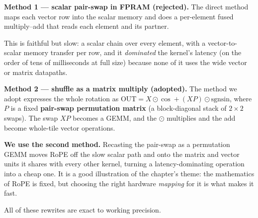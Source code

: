 \documentclass[11pt]{report}
\begin{document}
\textbf{Method 1 --- scalar pair-swap in FPRAM (rejected).} The direct
method maps each vector row into the scalar memory and does a per-element
fused multiply--add that reads each element and its partner.

\begin{algorithm}[H]
\DontPrintSemicolon
{}
\caption{RoPE, Method 1: scalar pair-swap (faithful but slow)}
\end{algorithm}

\noindent This is faithful but slow: a scalar chain over every element, with
a vector-to-scalar memory transfer per row, and it \emph{dominated} the
kernel's latency (on the order of tens of milliseconds at full size) because
none of it uses the wide vector or matrix datapaths.

\textbf{Method 2 --- shuffle as a matrix multiply (adopted).} The method we
adopt expresses the whole rotation as
$\text{OUT} = X \odot \cos + (X P)\odot \text{sgnsin}$, where $P$ is a fixed
\textbf{pair-swap permutation matrix} (a block-diagonal stack of $2\times2$
swaps). The swap $XP$ becomes a GEMM, and the $\odot$ multiplies and the add
become whole-tile vector operations.

\begin{algorithm}[H]
\DontPrintSemicolon
{}
\caption{RoPE, Method 2: pair-swap as a permutation GEMM (adopted)}
\end{algorithm}

\noindent \textbf{We use the second method.} Recasting the pair-swap as a
permutation GEMM moves RoPE off the slow scalar path and onto the matrix and
vector units it shares with every other kernel, turning a latency-dominating
operation into a cheap one. It is a good illustration of the chapter's
theme: the mathematics of RoPE is fixed, but choosing the right hardware
\emph{mapping} for it is what makes it fast.

All of these rewrites are exact to working precision.
\end{document}
